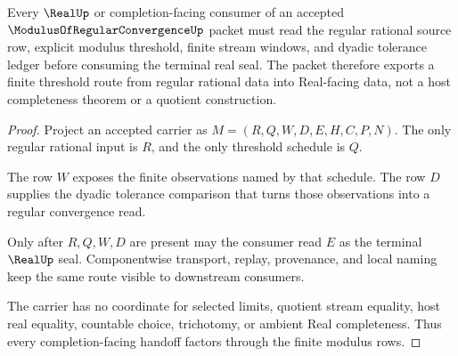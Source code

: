 \begin{theorem}
\label{thm:modulus-of-regular-convergence-finite-modulus-handoff}
Every $\RealUp$ or completion-facing consumer of an accepted $\ModulusOfRegularConvergenceUp$ packet must read the regular rational source row, explicit modulus threshold, finite stream windows, and dyadic tolerance ledger before consuming the terminal real seal. The packet therefore exports a finite threshold route from regular rational data into Real-facing data, not a host completeness theorem or a quotient construction.
\end{theorem}
\begin{proof}
Project an accepted carrier as $M=(R,Q,W,D,E,H,C,P,N)$. The only regular rational input is $R$, and the only threshold schedule is $Q$.

The row $W$ exposes the finite observations named by that schedule. The row $D$ supplies the dyadic tolerance comparison that turns those observations into a regular convergence read.

Only after $R,Q,W,D$ are present may the consumer read $E$ as the terminal $\RealUp$ seal. Componentwise transport, replay, provenance, and local naming keep the same route visible to downstream consumers.

The carrier has no coordinate for selected limits, quotient stream equality, host real equality, countable choice, trichotomy, or ambient Real completeness. Thus every completion-facing handoff factors through the finite modulus rows.
\end{proof}


\begin{closurestatus}{\ModulusOfRegularConvergenceUp}
  \theoryclosure{\seedClosure}
  \formalstatus{\unformalizedV}
\end{closurestatus}
